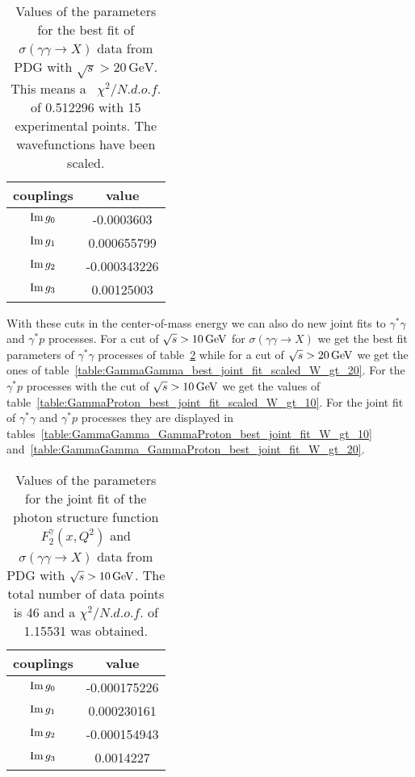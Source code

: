 \documentclass[preprint, 12pt]{elsarticle}
\begin{document}
\begin{table}[b!]
\centering
\caption{Values of the parameters for the best fit of $\sigma\left(\gamma \gamma \rightarrow X\right)$ data from PDG with $\sqrt{s} > 20 \, \text{GeV}$. This means a ~$\chi^2 / {N.d.o.f.}$ of 0.512296 with 15 experimental points. The wavefunctions have been scaled.}
\vspace{0.5cm}
\begin{tabular}{|c|c|}
\hline
couplings   & value \\
\hline
${\rm Im} \, g_0$  & -0.0003603\\ 
\hline
${\rm Im} \, g_1$  & 0.000655799 \\ 
\hline
${\rm Im} \, g_2$  & -0.000343226 \\
\hline
${\rm Im} \, g_3$  & 0.00125003 \\ 
\hline
\end{tabular}
\label{table:SigmaGammaGamma_W_gt_20_best_fit_scaled}
\end{table}
With these cuts in the center-of-mass energy we can also do new joint fits to $\gamma^*\gamma$ and $\gamma^*p$ processes. For a cut of $\sqrt{s} > 10 \, {\rm GeV}$ for $\sigma\left(\gamma \gamma \rightarrow X \right)$ we get the best fit parameters of $\gamma^* \gamma$ processes of table~\ref{table:GammaGamma_best_joint_fit_scaled_W_gt_10} while for a cut of  $\sqrt{s} > 20 \, {\rm GeV}$ we get the ones of table~\ref{table:GammaGamma_best_joint_fit_scaled_W_gt_20}. For the $\gamma^* p$ processes with the cut of $\sqrt{s} > 10 \, {\rm GeV}$ we get the values of table~\ref{table:GammaProton_best_joint_fit_scaled_W_gt_10}. For the joint fit of $\gamma^* \gamma$ and $\gamma^* p$ processes they are displayed in tables~\ref{table:GammaGamma_GammaProton_best_joint_fit_W_gt_10} and~\ref{table:GammaGamma_GammaProton_best_joint_fit_W_gt_20}.
\begin{table}[b!]
\centering
\caption{Values of the parameters for the joint fit of the photon structure function $F_2^{\gamma}\left(x, Q^2\right)$ and $\sigma\left(\gamma \gamma \rightarrow X\right)$ data from PDG with $\sqrt{s} > 10 {\rm \, GeV}$. The total number of data points is 46 and a $\chi^2 / {N.d.o.f.}$ of 1.15531 was obtained.}
\vspace{0.5cm}
\begin{tabular}{|c|c|}
\hline
couplings   & value \\
\hline
${\rm Im} \, g_0$  & -0.000175226\\ 
\hline
${\rm Im} \, g_1$  & 0.000230161 \\ 
\hline
${\rm Im} \, g_2$  & -0.000154943 \\
\hline
${\rm Im} \, g_3$  & 0.0014227 \\ 
\hline
\end{tabular}
\label{table:GammaGamma_best_joint_fit_scaled_W_gt_10}
\end{table}
\end{document}
